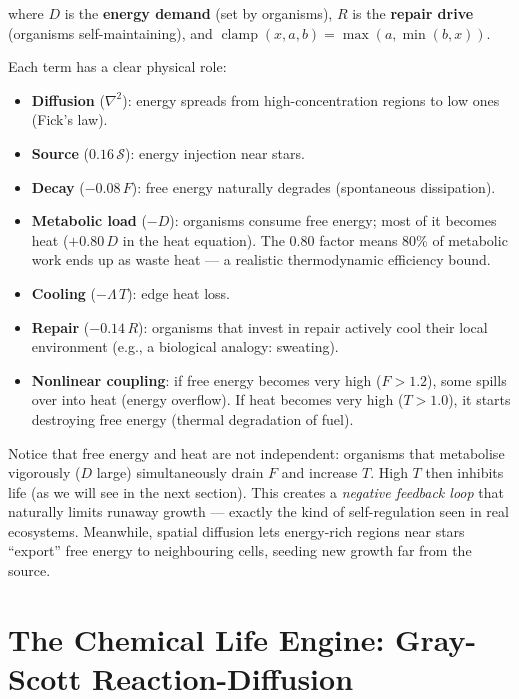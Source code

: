 \documentclass[12pt,a4paper]{article}
\DeclareMathOperator{\clamp}{clamp}
\begin{document}
where $D$ is the \textbf{energy demand} (set by organisms),
$R$ is the \textbf{repair drive} (organisms self-maintaining), and
$\clamp(x, a, b) = \max(a, \min(b, x))$.

Each term has a clear physical role:
\begin{itemize}[nosep]
  \item \textbf{Diffusion} ($\nabla^2$): energy spreads from
    high-concentration regions to low ones (Fick's law).
  \item \textbf{Source} ($0.16\,\mathcal{S}$): energy injection near stars.
  \item \textbf{Decay} ($-0.08\,F$): free energy naturally degrades
    (spontaneous dissipation).
  \item \textbf{Metabolic load} ($-D$): organisms consume free energy;
    most of it becomes heat ($+0.80\,D$ in the heat equation).
    The $0.80$ factor means 80\% of metabolic work ends up as waste heat
    — a realistic thermodynamic efficiency bound.
  \item \textbf{Cooling} ($-\Lambda\,T$): edge heat loss.
  \item \textbf{Repair} ($-0.14\,R$): organisms that invest in
    repair actively cool their local environment
    (e.g., a biological analogy: sweating).
  \item \textbf{Nonlinear coupling}: if free energy becomes very high
    ($F > 1.2$), some spills over into heat (energy overflow).
    If heat becomes very high ($T > 1.0$),
    it starts destroying free energy (thermal degradation of fuel).
\end{itemize}

\begin{tcolorbox}[intubox={Why these equations produce interesting behaviour}]
Notice that free energy and heat are not independent:
organisms that metabolise vigorously ($D$ large) simultaneously
drain $F$ and increase $T$.
High $T$ then inhibits life (as we will see in the next section).
This creates a \emph{negative feedback loop} that naturally limits
runaway growth — exactly the kind of self-regulation seen in
real ecosystems.
Meanwhile, spatial diffusion lets energy-rich regions near stars
``export'' free energy to neighbouring cells,
seeding new growth far from the source.
\end{tcolorbox}

\section{The Chemical Life Engine: Gray-Scott Reaction-Diffusion}
\end{document}
